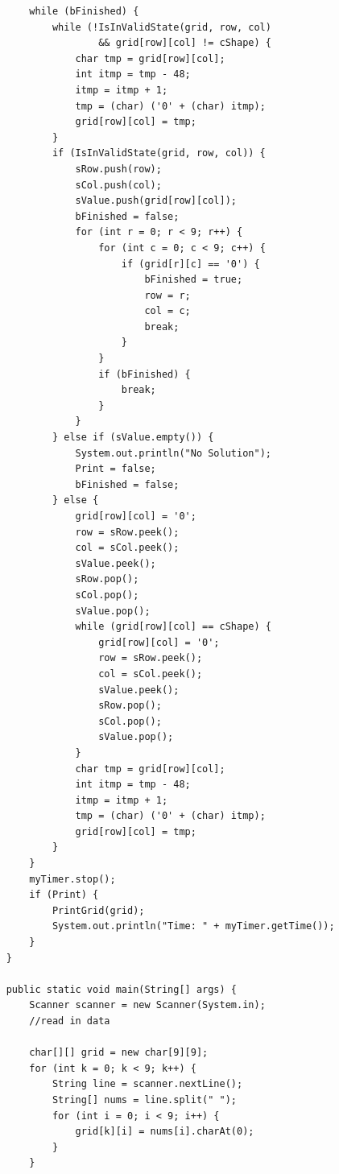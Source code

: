 \documentclass[11pt]{article}
\begin{document}
\begin{appendices}
\begin{lstlisting}
        while (bFinished) {
            while (!IsInValidState(grid, row, col) 
                    && grid[row][col] != cShape) {
                char tmp = grid[row][col];
                int itmp = tmp - 48;
                itmp = itmp + 1;
                tmp = (char) ('0' + (char) itmp);
                grid[row][col] = tmp;
            }
            if (IsInValidState(grid, row, col)) {
                sRow.push(row);
                sCol.push(col);
                sValue.push(grid[row][col]);
                bFinished = false;
                for (int r = 0; r < 9; r++) {
                    for (int c = 0; c < 9; c++) {
                        if (grid[r][c] == '0') {
                            bFinished = true;
                            row = r;
                            col = c;
                            break;
                        }
                    }
                    if (bFinished) {
                        break;
                    }
                }
            } else if (sValue.empty()) {
                System.out.println("No Solution");
                Print = false;
                bFinished = false;
            } else {
                grid[row][col] = '0';
                row = sRow.peek();
                col = sCol.peek();
                sValue.peek();
                sRow.pop();
                sCol.pop();
                sValue.pop();
                while (grid[row][col] == cShape) {
                    grid[row][col] = '0';
                    row = sRow.peek();
                    col = sCol.peek();
                    sValue.peek();
                    sRow.pop();
                    sCol.pop();
                    sValue.pop();
                }
                char tmp = grid[row][col];
                int itmp = tmp - 48;
                itmp = itmp + 1;
                tmp = (char) ('0' + (char) itmp);
                grid[row][col] = tmp;
            }
        }
        myTimer.stop();
        if (Print) {
            PrintGrid(grid);
            System.out.println("Time: " + myTimer.getTime());
        }
    }

    public static void main(String[] args) {
        Scanner scanner = new Scanner(System.in);
        //read in data

        char[][] grid = new char[9][9];
        for (int k = 0; k < 9; k++) {
            String line = scanner.nextLine();
            String[] nums = line.split(" ");
            for (int i = 0; i < 9; i++) {
                grid[k][i] = nums[i].charAt(0);
            }
        }


\end{lstlisting}
\end{appendices}
\end{document}

